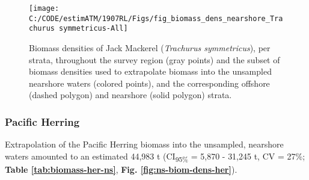 \documentclass[]{article}
\begin{document}
\newpage



\begin{figure}[H]

{\centering \texttt{[image: C:/CODE/estimATM/1907RL/Figs/fig\_biomass\_dens\_nearshore\_Trachurus symmetricus-All]} 

}

\caption{Biomass densities of Jack Mackerel (\emph{Trachurus symmetricus}), per strata, throughout the survey region (gray points) and the subset of biomass densities used to extrapolate biomass into the unsampled nearshore waters (colored points), and the corresponding offshore (dashed polygon) and nearshore (solid polygon) strata.}\label{fig:ns-biom-dens-jack}
\end{figure}

\newpage

\hypertarget{appendix-nearshore-biomass-her}{%
\subsubsection{Pacific Herring}\label{appendix-nearshore-biomass-her}}

Extrapolation of the Pacific Herring biomass into the unsampled, nearshore waters amounted to an estimated 44,983 t (CI\textsubscript{95\%} = 5,870 - 31,245 t, CV = 27\%; \textbf{Table \ref{tab:biomass-her-ns}}, \textbf{Fig. \ref{fig:ns-biom-dens-her}}).



\begin{table}[!h]

\caption{\label{tab:biomass-her-ns}Biomass estimates (metric tons, t) and their precision (upper and lower 95\% confidence intervals, CI\textsubscript{95\%}; standard deviation, SD; and coefficient of variation, CV) for Pacific Herring (\emph{Clupea pallasii}) in the unsampled, nearshore waters. Stratum areas are nmi\textsuperscript{2}.}
\centering
{}
\end{table}
\end{document}
